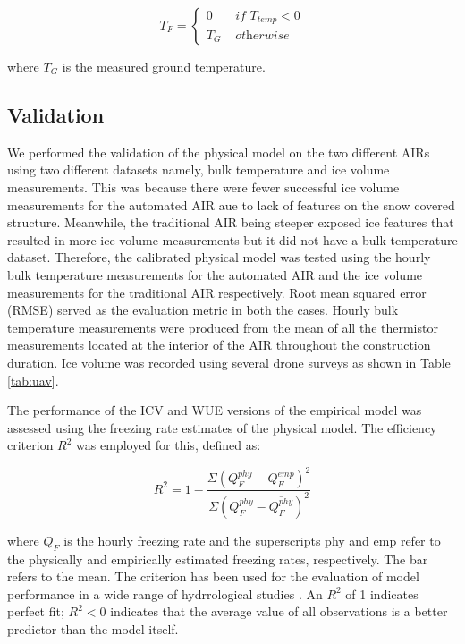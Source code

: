 \documentclass[tc, manuscript]{copernicus}
\begin{document}
\begin{equation}
	T_{F} = \left\{ \begin{array}{ll}
		0 & \textit{ if } T_{temp} < 0 \\
		T_{G} & \textit{ otherwise}
	\end{array} \right.
\end{equation}

where $T_{G}$ is the measured ground temperature.

\subsection{Validation}
We performed the validation of the physical model on the two different AIRs using two different datasets namely,
bulk temperature and ice volume measurements. This was because there were fewer successful ice volume
measurements for the automated AIR aue to lack of features on the snow covered structure. Meanwhile, the traditional
AIR being steeper exposed ice features that resulted in more ice volume measurements but it did not have a bulk
temperature dataset. Therefore, the calibrated physical model was tested using the hourly bulk temperature
measurements for the automated AIR and the ice volume measurements for the traditional AIR respectively. Root
mean squared error (RMSE) served as the evaluation metric in both the cases. Hourly bulk temperature
measurements were produced from the mean of all the thermistor measurements located at the interior of the AIR
throughout the construction duration. Ice volume was recorded using several drone surveys as shown in Table
\ref{tab:uav}.

The performance of the ICV and WUE versions of the empirical model was assessed using the freezing rate
estimates of the physical model. The efficiency criterion $R^2$ \citep{nashRiverFlowForecasting1970} was
employed for this, defined as:

\begin{equation}
  R^2 = 1 - \frac{\Sigma(Q^{phy}_{F} - Q^{emp}_{F})^2}{\Sigma(Q^{phy}_{F} - \overline{{Q^{phy}_{F}}})^2}
\end{equation}

where $Q_{F}$ is the hourly freezing rate and the superscripts phy and emp refer to the physically and
empirically estimated freezing rates, respectively. The bar refers to the mean. The criterion has been used for
the evaluation of model performance in a wide range of hydrrological studies
\citep[e.g.,][]{wilcoxPredictingRunoffRangeland1990}. An $R^2$ of 1 indicates perfect fit; $R^2<0$ indicates
that the average value of all observations is a better predictor than the model itself. 
\end{document}
